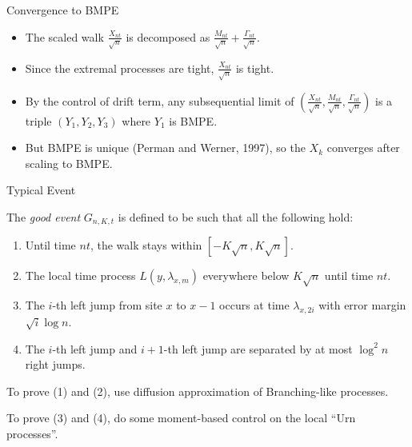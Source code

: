 \documentclass{if-beamer}
\begin{document}

\begin{frame}{Convergence to BMPE}
    \begin{block}{}
        \begin{itemize}
            \item The scaled walk $\frac{X_{nt}}{\sqrt{n}}$ is decomposed as $\frac{M_{nt}}{\sqrt{n}} + \frac{\Gamma_{nt}}{\sqrt{n}}$.
            \item Since the extremal processes are tight, $\frac{X_{nt}}{\sqrt{n}}$ is tight.
            \item By the control of drift term, any subsequential limit of $\left(\frac{X_{nt}}{\sqrt{n}},\frac{M_{nt}}{\sqrt{n}} , \frac{\Gamma_{nt}}{\sqrt{n}}\right)$ is a triple $(Y_1, Y_2, Y_3)$ where $Y_1$ is BMPE.
            \item But BMPE is unique (Perman and Werner, 1997), so the $X_k$ converges after scaling to BMPE.
        \end{itemize}
    \end{block}
\end{frame}

\begin{frame}{Typical Event}
    \begin{block}{}
        The \textit{good event} $G_{n, K, t}$ is defined to be such that all the following hold:
        \begin{enumerate}
            \item Until time $nt$, the walk stays within $[-K\sqrt{n}, K\sqrt{n}]$.
            \item The local time process $L(y, \lambda_{x, m})$ everywhere below $K\sqrt{n}$ until time $nt$.
            \item The $i$-th left jump from site $x$ to $x-1$ occurs at time $\lambda_{x, 2i}$ with error margin $\sqrt{i} \log{n}$.
            \item The $i$-th left jump and $i+1$-th left jump are separated by at most $\log^2 n$ right jumps.
        \end{enumerate}
    \end{block}
    \begin{exampleblock}{}
        To prove (1) and (2), use diffusion approximation of Branching-like processes.
        
        To prove (3) and (4), do some moment-based control on the local ``Urn processes''.

    \end{exampleblock}
\end{frame}
\end{document}

